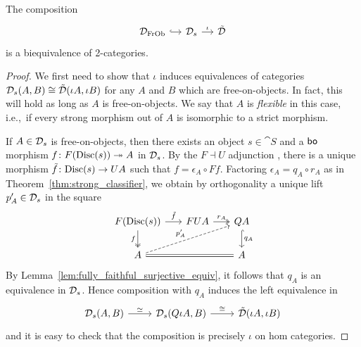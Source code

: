 \documentclass[11pt,oneside,article]{memoir}
\begin{document}
\begin{theorem}\label{thm:free_on_objects_strong_equivalence}
   The composition
   \begin{equation*}
      \begin{tikzcd}[column sep=small]
         \ccatFrOb{D} \ar[r,hook]
            & \scat{D} \ar[r,"\iota"]
            & \pcat{D}
      \end{tikzcd}
   \end{equation*}
   is a biequivalence of 2-categories.
\end{theorem}
\begin{proof}
   We first need to show that $\iota$ induces equivalences of categories
   $\mathcal{D}_s(A,B)\cong\tilde{\mathcal{D}}(\iota A,\iota B)$ for any $A$ and $B$ which are
   free-on-objects. In fact, this will hold as long as $A$ is free-on-objects. We say that $A$ is
   \emph{flexible} in this case, i.e.,~if every strong morphism out of $A$ is isomorphic to a strict
   morphism.

   If $A\in\mathcal{D}_s$ is free-on-objects, then there exists an object $s\in\cat{S}$ and a $\mathsf{bo}$
   morphism $f\colon F(\mathrm{Disc}(s))\twoheadrightarrow A$ in $\mathcal{D}_s$. By the $F\dashv U$
   adjunction , there is a unique morphism $\tilde{f}\colon\mathrm{Disc}(s)\to UA$ such that
   $f=\epsilon_A\circ Ff$. Factoring $\epsilon_A=q_A\circ r_A$ as in
   Theorem~\ref{thm:strong_classifier}, we obtain by orthogonality a unique lift $p'_A\in\mathcal{D}_s$
   in the square
   \begin{equation*}
      \begin{tikzcd}[column sep=1.7em]
         F(\Disc(s)) \ar[d,two heads,"f"'] \ar[r,"\tilde{f}"]
            & FUA \ar[r,two heads,"r_A"]
            & QA \ar[d,hook,"q_A"] \\
         A \ar[urr,dashed,"p'_A"] \ar[rr,equal] && A
      \end{tikzcd}
   \end{equation*}
   By Lemma~\ref{lem:fully_faithful_surjective_equiv}, it follows that $q_A$ is an equivalence in
   $\mathcal{D}_s$. Hence composition with $q_A$ induces the left equivalence in
   \begin{equation*}
      \begin{tikzcd}
         \scat{D}(A,B) \ar[r,"\equiv"]
            & \scat{D}(Q\iota A,B) \ar[r,"\iso"]
            & \pcat{D}(\iota A,\iota B)
      \end{tikzcd}
   \end{equation*}
   and it is easy to check that the composition is precisely $\iota$ on hom categories.


\end{proof}
\end{document}

